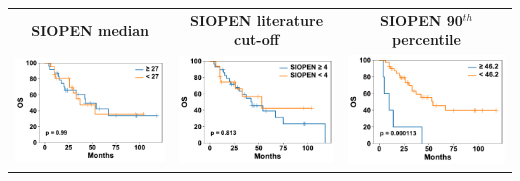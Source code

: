 \begin{tabular}{ccc}
\\[2ex]
\textbf{SIOPEN median}
&
\textbf{SIOPEN literature cut-off}
&
\textbf{SIOPEN 90$^{th}$ percentile}
\\[1ex]
\includegraphics[width=\coll]{SIOPEN_percentiles/50}
&
\includegraphics[width=\coll]{SIOPEN}
&
\includegraphics[width=\coll]{SIOPEN_percentiles/90}

\end{tabular}
